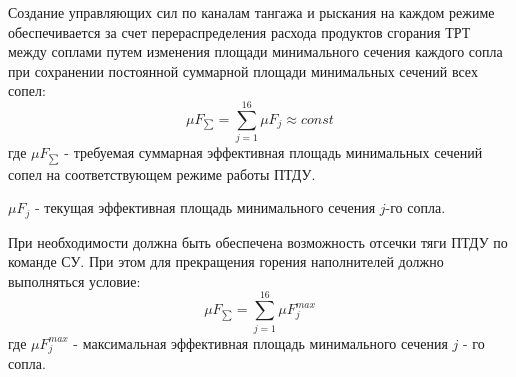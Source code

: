 Создание управляющих сил по каналам тангажа и рыскания на каждом режиме обеспечивается за счет перераспределения расхода продуктов сгорания ТРТ между соплами путем изменения площади минимального сечения каждого сопла при сохранении постоянной суммарной площади минимальных сечений всех сопел:
\begin{equation}
\mu F_{\sum} = \sum_{j=1}^{16} \mu F_j \approx const
\end{equation}
где $\mu F_{\sum}$ - требуемая суммарная эффективная площадь минимальных сечений сопел на соответствующем режиме работы ПТДУ.

$\mu F_j$ - текущая эффективная площадь минимального сечения $j$-го сопла.

При необходимости должна быть обеспечена возможность отсечки тяги ПТДУ по команде СУ. При этом для прекращения горения наполнителей должно выполняться условие:
\begin{equation}
\mu F_{\sum} = \sum_{j=1}^{16} \mu F_j^{max}
\end{equation}
где $\mu F_j^{max}$ - максимальная эффективная площадь минимального сечения $j$ - го сопла.


